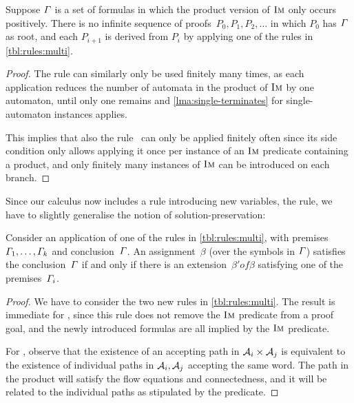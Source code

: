 \begin{lemma}\label{lma:multi-terminates}
  Suppose $\varGamma{}$ is a set of formulas in which the product
  version of $\operatorname{\textsc{Im}}$ only occurs positively. There is no
  infinite sequence of proofs~$P_0, P_1, P_2, \ldots$ in which $P_0$
  has $\varGamma{}$ as root, and each $P_{i+1}$ is derived from
  $P_i$ by applying one of the rules in \cref{tbl:rules:multi}.
\end{lemma}

\begin{proof}
  The rule \Materialise{} can similarly only be used finitely many times, as
  each application reduces the number of automata in the product of $\operatorname{\textsc{Im}}$ by
  one automaton, until only one remains and \cref{lma:single-terminates} for
  single-automaton instances applies.
  
  This implies that also the rule~\ExpandM{} can only be applied
  finitely often since its side condition only allows applying it once
  per instance of an $\operatorname{\textsc{Im}}$ predicate containing a product, and only finitely
  many instances of $\operatorname{\textsc{Im}}$ can be introduced on each branch.
\end{proof}


Since our calculus now includes a rule introducing new variables, the
\Materialise{} rule, we have to slightly generalise the notion of
solution-preservation:
%
\begin{lemma}\label{lma:multi-correct}
  Consider an application of one of the rules in
  \cref{tbl:rules:multi}, with
  premises~$\varGamma_1, \ldots, \varGamma_k$ and
  conclusion~$\varGamma$. An assignment~$\beta$ (over the symbols in
  $\varGamma$) satisfies the conclusion~$\varGamma$ if and only if
  there is an extension~$\beta' of \beta$ satisfying one of the
  premises~$\varGamma_i$.
\end{lemma}

\begin{proof}
  We have to consider the two new rules in \cref{tbl:rules:multi}. The
  result is immediate for \ExpandM{}, since this rule does not remove the
  $\operatorname{\textsc{Im}}$ predicate from a proof goal, and the newly introduced formulas
  are all implied by the $\operatorname{\textsc{Im}}$ predicate.

  For \Materialise{}, observe that the existence of an accepting path
  in $\mathcal{A}_i \times \mathcal{A}_j$ is equivalent to the existence
  of individual paths in $\mathcal{A}_i, \mathcal{A}_j$ accepting the
  same word. The path in the product will satisfy the flow equations
  and connectedness, and it will be related to the individual paths as
  stipulated by the \BindingSum{} predicate.
\end{proof}